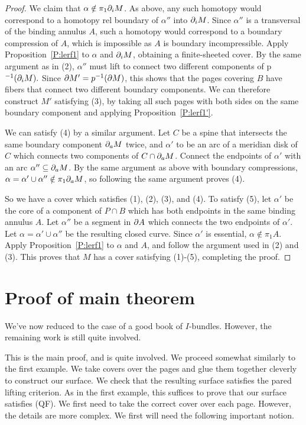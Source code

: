 \begin{proof}
We claim that $\alpha \notin \pi_1 \partial_i M$. As above, any such homotopy would
correspond to a homotopy rel boundary of $\alpha''$ into $\partial_i M$. Since
$\alpha''$ is a transversal of the binding annulus $A$, such a homotopy would
correspond to a boundary compression of $A$, which is impossible as $A$ is
boundary incompressible. Apply Proposition~\ref{P:lerf1} to $\alpha$ and $\partial_i
M$, obtaining a finite-sheeted cover. By the same argument as in (2),
$\alpha''$ must lift to connect two different components of p$^{-1}(\partial_i M).$
Since $\partial M' = p^{-1}(\partial M)$, this shows that the pages covering $B$ have
fibers that connect two different boundary components. We can therefore
construct $M'$ satisfying (3), by taking all such pages with both sides on the
same boundary component and applying Proposition~\ref{P:lerf1'}.

We can satisfy (4) by a similar argument. Let $C$ be a spine that intersects
the same boundary component $\partial_a M$ twice, and $\alpha'$ to be an arc of
a meridian disk of $C$ which connects two components of $C \cap \partial_a M$.
Connect the endpoints of $\alpha'$ with an arc $\alpha'' \subseteq \partial_a M$. By the
same argument as above with boundary compressions, $\alpha=\alpha' \cup
\alpha'' \notin \pi_1 \partial_a M$, so following the same argument proves (4).

So we have a cover which satisfies (1), (2), (3), and (4). To satisfy (5), let
$\alpha'$ be the core of a component of $P \cap B$ which has both endpoints in
the same binding annulus $A$. Let $\alpha''$ be a segment in $\partial A$ which
connects the two endpoints of $\alpha'$. Let $\alpha = \alpha' \cup \alpha''$
be the resulting closed curve. Since $\alpha'$ is essential, $\alpha \notin
\pi_1A$.  Apply Proposition~\ref{P:lerf1} to $\alpha$ and $A$, and follow the
argument used in (2) and (3).  This proves that $M$ has a cover satisfying
(1)-(5), completing the proof.

\end{proof}

\section{Proof of main theorem}

We've now reduced to the case of a good book of $I$-bundles. However, the
remaining work is still quite involved.

This is the main proof, and is quite involved. We proceed somewhat similarly to
the first example. We take covers over the pages and glue them together
cleverly to construct our surface. We check that the resulting surface
satisfies the pared lifting criterion. As in the first example, this suffices
to prove that our surface satisfies (QF).  We first need to take the correct
cover over each page. However, the details are more complex. We first will need
the following important notion.

